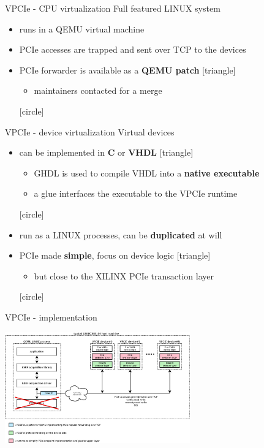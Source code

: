 \documentclass{beamer}
\begin{document}
\begin{frame}{VPCIe - CPU virtualization}
  Full featured LINUX system
  \begin{itemize}
  \item runs in a QEMU virtual machine
  \item PCIe accesses are trapped and sent over TCP to the devices
  \item PCIe forwarder is available as a \textbf{QEMU patch}
    [triangle]
    \begin{itemize}
    \item maintainers contacted for a merge
    \end{itemize}
    [circle]
  \end{itemize}
\end{frame}

\begin{frame}{VPCIe - device virtualization}
  Virtual devices
  \begin{itemize}
  \item can be implemented in \textbf{C} or \textbf{VHDL}
    [triangle]
    \begin{itemize} 
    \item GHDL is used to compile VHDL into a \textbf{native executable}
    \item a glue interfaces the executable to the VPCIe runtime
    \end{itemize}
    [circle]
  \item run as a LINUX processes, can be \textbf{duplicated} at will
  \item PCIe made \textbf{simple}, focus on device logic
    [triangle]
    \begin{itemize}
    \item but close to the XILINX PCIe transaction layer
    \end{itemize}
    [circle]
  \end{itemize}
\end{frame}

\begin{frame}{VPCIe - implementation}
  \begin{center}
  \includegraphics[width=80mm]{pic/dv_implem/main.jpeg}
  \end{center}
\end{frame}
\end{document}
